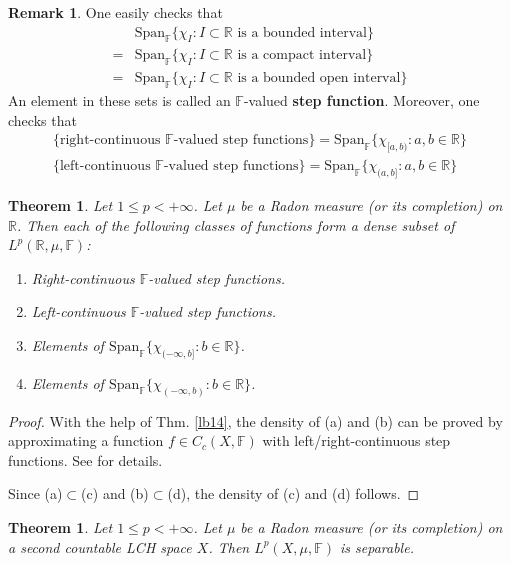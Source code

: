 \documentclass[12pt,b5paper,notitlepage]{article}
\theoremstyle{definition}
\newtheorem{rem}[df]{Remark}
\theoremstyle{plain}
\newtheorem{thm}[df]{Theorem}
\newcommand{\Span}{\mathrm{Span}}
\newcommand{\Rbb}{\mathbb R}
\newcommand{\Fbb}{\mathbb F}
\numberwithin{equation}{section}
\begin{document}
\begin{rem}
One easily checks that
\begin{align*}
&\Span_\Fbb\{\chi_I:I\subset\Rbb\text{ is a bounded interval}\}\\
=&\Span_\Fbb\{\chi_I:I\subset\Rbb\text{ is a compact interval}\}\\
=&\Span_\Fbb\{\chi_I:I\subset\Rbb\text{ is a bounded open interval}\}
\end{align*}
An element in these sets is called an $\Fbb$-valued \textbf{step function}.  Moreover, one checks that
\begin{gather*}
\{\text{right-continuous $\Fbb$-valued step functions}\}=\Span_\Fbb\{\chi_{[a,b)}:a,b\in\Rbb\}\\
\{\text{left-continuous $\Fbb$-valued step functions}\}=\Span_\Fbb\{\chi_{(a,b]}:a,b\in\Rbb\}
\end{gather*}
\end{rem}


\begin{thm}\label{lb77}
Let $1\leq p<+\infty$. Let $\mu$ be a Radon measure (or its completion) on $\Rbb$. Then each of the following classes of functions form a dense subset of $L^p(\Rbb,\mu,\Fbb)$:
\begin{enumerate}[label=(\alph*)]
\item Right-continuous $\Fbb$-valued step functions.
\item Left-continuous $\Fbb$-valued step functions.
\item Elements of $\Span_\Fbb\{\chi_{(-\infty,b]}:b\in\Rbb\}$.
\item Elements of $\Span_\Fbb\{\chi_{(-\infty,b)}:b\in\Rbb\}$.
\end{enumerate}
\end{thm}

\begin{proof}
With the help of Thm. \ref{lb14}, the density of (a) and (b) can be proved by approximating a function $f\in C_c(X,\Fbb)$ with left/right-continuous step functions. See \cite[Sec. 27.2]{Gui-A} for details.

Since (a)$\subset$(c) and (b)$\subset$(d), the density of (c) and (d) follows.
\end{proof}




\begin{thm}\label{lb85}
Let $1\leq p<+\infty$. Let $\mu$ be a Radon measure (or its completion) on a second countable LCH space $X$. Then $L^p(X,\mu,\Fbb)$ is separable.
\end{thm}
\end{document}
